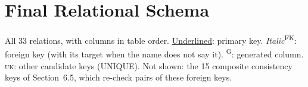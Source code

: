 \section{Final Relational Schema}
All 33 relations, with columns in table order. \underline{Underlined}: primary key. \textit{Italic}\textsuperscript{FK}:
foreign key (with its target when the name does not say it). \textsuperscript{G}: generated column. \textsc{uk}: other
candidate keys (UNIQUE). Not shown: the 15 composite consistency keys of Section~6.5, which re-check pairs of
these foreign keys.

\begin{footnotesize}

\end{footnotesize}
